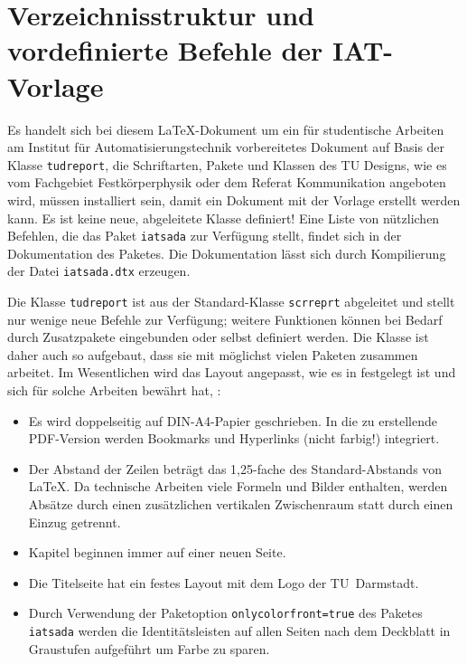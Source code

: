 \chapter{Verzeichnisstruktur und vordefinierte Befehle der IAT-Vorlage}
\label{cha:Verzeichnisstruktur}
Es handelt sich bei diesem \LaTeX-Dokument um ein für studentische Arbeiten am Institut für Automatisierungstechnik vorbereitetes Dokument auf Basis der Klasse \verb|tudreport|, \dah die Schriftarten, Pakete und Klassen des TU Designs, wie es vom Fachgebiet Festkörperphysik oder dem Referat Kommunikation angeboten wird, müssen installiert sein, damit ein Dokument mit der Vorlage erstellt werden kann.
Es ist keine neue, abgeleitete Klasse definiert!
Eine Liste von nützlichen Befehlen, die das Paket \texttt{iatsada} zur Verfügung stellt, findet sich in der Dokumentation des Paketes.
Die Dokumentation lässt sich durch Kompilierung der Datei \texttt{iatsada.dtx} erzeugen.

Die Klasse \verb|tudreport| ist aus der Standard-Klasse \verb|scrreprt| abgeleitet und stellt nur wenige neue Befehle zur Verfügung; weitere Funktionen können bei
Bedarf durch Zusatzpakete eingebunden oder selbst definiert werden.
Die Klasse ist daher auch so aufgebaut, dass sie mit möglichst vielen Paketen zusammen arbeitet.
Im Wesentlichen wird das Layout angepasst, wie es in \cite{Richtlinien} festgelegt ist und sich für solche Arbeiten bewährt hat, \zB:
\begin{itemize}
	\item Es wird doppelseitig auf DIN-A4-Papier geschrieben.
	In die zu erstellende PDF-Version werden Bookmarks und Hyperlinks (nicht farbig!) integriert.
	\item Der Abstand der Zeilen beträgt das 1,25-fache des Standard-Abstands von \LaTeX.
	Da technische Arbeiten viele Formeln und Bilder enthalten, werden Absätze durch einen zusätzlichen vertikalen Zwischenraum statt durch einen Einzug getrennt.
	\item Kapitel beginnen immer auf einer neuen Seite.
	\item Die Titelseite hat ein festes Layout mit dem Logo der TU~Darmstadt.
	\item Durch Verwendung der Paketoption \texttt{onlycolorfront=true} des Paketes \texttt{iatsada} werden die Identitätsleisten auf allen Seiten nach dem Deckblatt in Graustufen aufgeführt um Farbe zu sparen.
\end{itemize}
%
%
